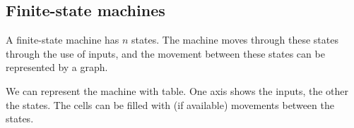 
\subsection{Finite-state machines}

A finite-state machine has \(n\) states. The machine moves through these states through the use of inputs, and the movement between these states can be represented by a graph.

We can represent the machine with table. One axis shows the inputs, the other the states. The cells can be filled with (if available) movements between the states.

